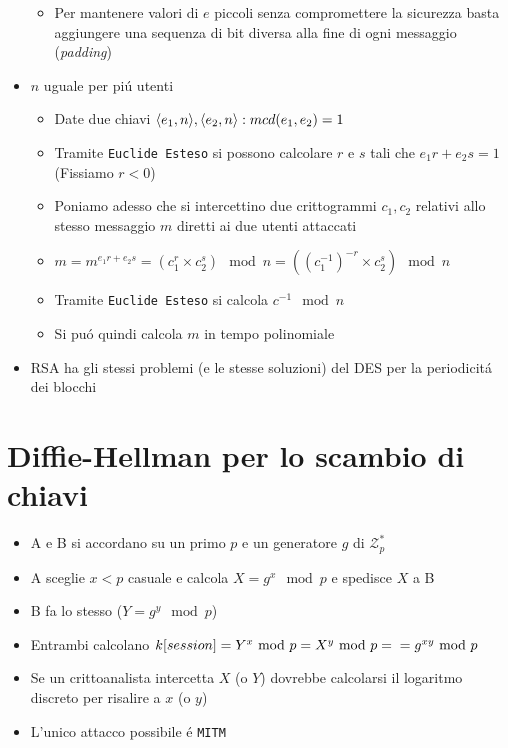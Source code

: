 \begin{itemize}
\begin{itemize}
        \item Per mantenere valori di $e$ piccoli senza compromettere la sicurezza basta aggiungere una sequenza di bit diversa alla fine di ogni messaggio (\textit{padding})
    \end{itemize}
    \item $n$ uguale per pi\'u utenti
    \begin{itemize}
        \item Date due chiavi $\abracket{e_1, n}, \abracket{e_2, n} : mcd(e_1, e_2) = 1$
        \item Tramite \texttt{Euclide Esteso} si possono calcolare $r$ e $s$ tali che $e_1r + e_2s = 1$ (Fissiamo $r < 0$)
        \item Poniamo adesso che si intercettino due crittogrammi $c_1, c_2$ relativi allo stesso messaggio $m$ diretti ai due utenti attaccati
        \item $m = m^{e_1r+e_2s} = (c_1^r \times c_2^s) \mod{n} = ((c_1^{-1})^{-r} \times c_2^s) \mod{n}$
        \item Tramite \texttt{Euclide Esteso} si calcola $c^{-1} \mod{n}$
        \item Si pu\'o quindi calcola $m$ in tempo polinomiale
    \end{itemize}
    \item RSA ha gli stessi problemi (e le stesse soluzioni) del DES per la periodicit\'a dei blocchi 
\end{itemize}

\section{Diffie-Hellman per lo scambio di chiavi}

\begin{itemize}
    \item A e B si accordano su un primo $p$ e un generatore $g$ di $\mathcal{Z}_p^*$
    \item A sceglie $x < p$ casuale e calcola $X = g^x \mod{p}$ e spedisce $X$ a B
    \item B fa lo stesso ($Y = g^y \mod{p}$)
    \item Entrambi calcolano $k[session] = Y^x \mod{p} = X^y \mod{p} =\\= g^{xy} \mod{p}$
    \item Se un crittoanalista intercetta $X$ (o $Y$) dovrebbe calcolarsi il logaritmo discreto per risalire a $x$ (o $y$)
    \item L'unico attacco possibile \'e \texttt{MITM}
\end{itemize}

